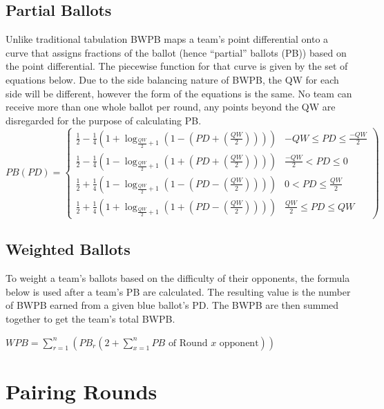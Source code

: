 \documentclass{article}
\begin{document}
\subsection{Partial Ballots}
Unlike traditional tabulation BWPB maps a team's point differential onto a curve that assigns fractions of the ballot (hence ``partial'' ballots (PB)) based on the point differential. The piecewise function for that curve is given by the set of equations below. Due to the side balancing nature of BWPB, the QW for each side will be different, however the form of the equations is the same. No team can receive more than one whole ballot per round, any points beyond the QW are disregarded for the purpose of calculating PB.\\
\begin{displaymath}
   PB(PD) = \left\{
     \begin{array}{lr}
       \frac{1}{2}-\frac{1}{4}\left(1+\log_{\frac{QW}{2}+1}\left(1-\left(PD+\left(\frac{QW}{2}\right)\right)\right)\right) &  -QW\le PD\le \frac{-QW}{2}\\
       \frac{1}{2}-\frac{1}{4}\left(1-\log_{\frac{QW}{2}+1}\left(1+\left(PD+\left(\frac{QW}{2}\right)\right)\right)\right) &  \frac{-QW}{2}<PD\le 0\\
       \frac{1}{2}+\frac{1}{4}\left(1-\log_{\frac{QW}{2}+1}\left(1-\left(PD-\left(\frac{QW}{2}\right)\right)\right)\right) &  0<PD\le\frac{QW}{2}\\
       \frac{1}{2}+\frac{1}{4}\left(1+\log_{\frac{QW}{2}+1}\left(1+\left(PD-\left(\frac{QW}{2}\right)\right)\right)\right) & \frac{QW}{2}\le PD \le QW
     \end{array}
  \right)
\end{displaymath}
\subsection{Weighted Ballots}
To weight a team's ballots based on the difficulty of their opponents, the formula below is used after a team's PB are calculated. The resulting value is the number of BWPB earned from a given blue ballot's PD. The BWPB are then summed together to get the team's total BWPB.

\begin{center}$WPB=\sum\limits_{r=1}^{n} \left(PB_{r}\left(2+\sum\limits_{x=1}^{n}\mbox{$PB$ of Round $x$ opponent}\right)\right)$\end{center}

\section{Pairing Rounds}
\label{roundPairing}
\end{document}
